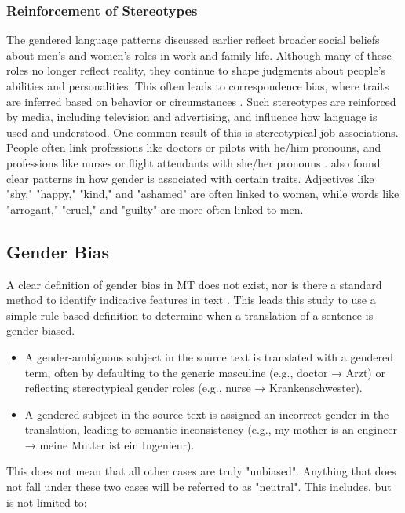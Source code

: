     \subsubsection{Reinforcement of Stereotypes}
        The gendered language patterns discussed earlier reflect broader social beliefs about men’s and women’s roles in work and family life. Although many of these roles no longer reflect reality, they continue to shape judgments about people’s abilities and personalities. This often leads to correspondence bias, where traits are inferred based on behavior or circumstances \parencite{godsilEffectsGenderRoles2016}. Such stereotypes are reinforced by media, including television and advertising, and influence how language is used and understood. One common result of this is stereotypical job associations. People often link professions like doctors or pilots with he/him pronouns, and professions like nurses or flight attendants with she/her pronouns \parencite{shresthaExploringGenderBiases2022}. \textcite{pratesAssessingGenderBias2019} also found clear patterns in how gender is associated with certain traits. Adjectives like "shy," "happy," "kind," and "ashamed" are often linked to women, while words like "arrogant," "cruel," and "guilty" are more often linked to men. 

  
 \subsection{Gender Bias} \label{subsection:definition_gb}
    A clear definition of gender bias in MT does not exist, nor is there a standard method to identify indicative features in text \parencite{barclayInvestigatingMarkersDrivers2024a}. This leads this study to use a simple rule-based definition to determine when a translation of a sentence is gender biased.

        \begin{itemize}
        \item A gender-ambiguous subject in the source text is translated with a gendered term, often by defaulting to the generic masculine (e.g., doctor → Arzt) or reflecting stereotypical gender roles (e.g., nurse → Krankenschwester).
        \item A gendered subject in the source text is assigned an incorrect gender in the translation, leading to semantic inconsistency (e.g., my mother is an engineer → meine Mutter ist ein Ingenieur).
        \end{itemize}

    \noindent This does not mean that all other cases are truly "unbiased". Anything that does not fall under these two cases will be referred to as "neutral". This includes, but is not limited to:


